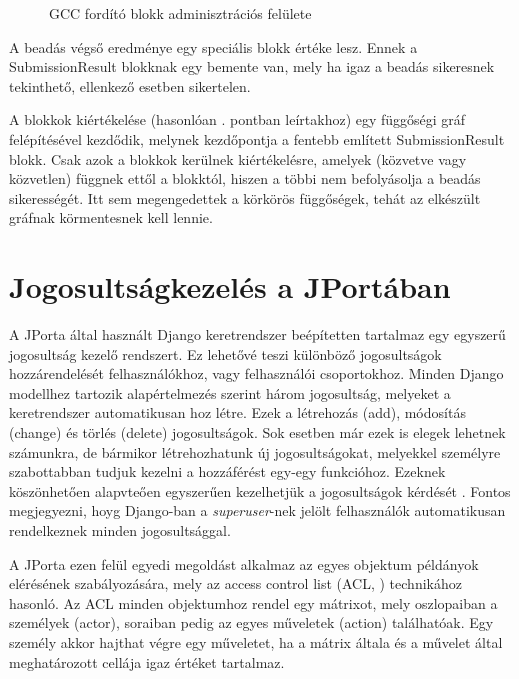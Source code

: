 \begin{figure}[p]
    \centering
    \caption{GCC fordító blokk adminisztrációs felülete}
    \label{fig:exercise_blokk}
\end{figure}

A beadás végső eredménye egy speciális blokk értéke lesz. Ennek a SubmissionResult blokknak egy bemente van, mely ha igaz a beadás sikeresnek tekinthető, ellenkező esetben sikertelen.

A blokkok kiértékelése (hasonlóan . pontban leírtakhoz) egy függőségi gráf felépítésével kezdődik, melynek kezdőpontja a fentebb említett SubmissionResult blokk. Csak azok a blokkok kerülnek kiértékelésre, amelyek (közvetve vagy közvetlen) függnek ettől a blokktól, hiszen a többi nem befolyásolja a beadás sikerességét.  Itt sem megengedettek a körkörös függőségek, tehát az elkészült gráfnak körmentesnek kell lennie.

\section{Jogosultságkezelés a JPortában}\label{subsection:permissions}

A JPorta által használt Django keretrendszer beépítetten tartalmaz egy egyszerű jogosultság kezelő rendszert. Ez lehetővé teszi különböző jogosultságok hozzárendelését felhasználókhoz, vagy felhasználói csoportokhoz. Minden Django modellhez \cite{DjangoModel} tartozik alapértelmezés szerint három jogosultság, melyeket a keretrendszer automatikusan hoz létre. Ezek a létrehozás (add), módosítás (change) és törlés (delete) jogosultságok. Sok esetben már ezek is elegek lehetnek számunkra, de bármikor létrehozhatunk új jogosultságokat, melyekkel személyre szabottabban tudjuk kezelni a hozzáférést egy-egy funkcióhoz. Ezeknek köszönhetően alapvteően egyszerűen kezelhetjük a jogosultságok kérdését \cite{DjangoAuth}. Fontos megjegyezni, hoyg Django-ban a \textit{superuser}-nek jelölt felhasználók automatikusan rendelkeznek minden jogosultsággal.

A JPorta ezen felül egyedi megoldást alkalmaz az egyes objektum példányok elérésének szabályozására, mely az access control list (ACL, \cite{ACL}) technikához hasonló. Az ACL minden objektumhoz rendel egy mátrixot, mely oszlopaiban a személyek (actor), soraiban pedig az egyes műveletek (action) találhatóak. Egy személy akkor hajthat végre egy műveletet, ha a mátrix általa és a művelet által meghatározott cellája igaz értéket tartalmaz.

